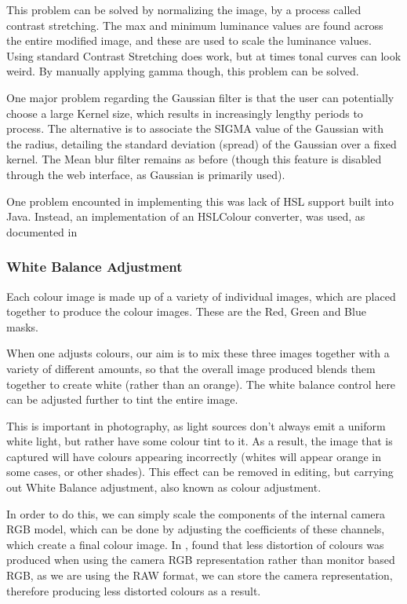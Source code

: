 \documentclass[10pt,a4paper]{article}
\begin{document}
    This problem can be solved by normalizing the image, by a process called contrast stretching. The max and minimum luminance values are found across the
    entire modified image, and these are used to scale the luminance values. Using standard Contrast Stretching does work, but at times tonal curves can look weird. By manually applying gamma though, this problem can be
    solved.

    One major problem regarding the Gaussian filter is that the user can potentially choose a large Kernel size, which results in increasingly lengthy
    periods to process. The alternative is to associate the SIGMA value of the Gaussian with the radius, detailing the standard deviation (spread) of the
    Gaussian over a fixed kernel. The Mean blur filter remains as before (though this feature is disabled through the web interface, as Gaussian is
    primarily used).

    One problem encounted in implementing this was lack of HSL support built into Java. Instead, an implementation of an HSLColour converter, was used,
    as documented in \cite{HSLImplementation}
\subsubsection{White Balance Adjustment}
    Each colour image is made up of a variety of individual images, which are placed together
    to produce the colour images. These are the Red, Green and Blue masks.

    When one adjusts colours, our aim is to mix these three images together with a variety of different
    amounts, so that the overall image produced blends them together to create white (rather than an orange).
    The white balance control here can be adjusted further to tint the entire image.

    This is important in photography, as light sources don't always emit a uniform white light, but rather have some
    colour tint to it. As a result, the image that is captured will have colours appearing incorrectly (whites will appear 
    orange in some cases, or other shades). This effect can be removed in editing, but carrying out White Balance adjustment, also
    known as colour adjustment.

    In order to do this, we can simply scale the components of the internal camera RGB model, which can be done
    by adjusting the coefficients of these channels, which create a final colour image. In \cite{WhiteBalance}, \citeauthor{WhiteBalance}
    found that less distortion of colours was produced when using the camera RGB representation rather than monitor based
    RGB, as we are using the RAW format, we can store the camera representation, therefore producing less distorted colours
    as a result.
\end{document}
